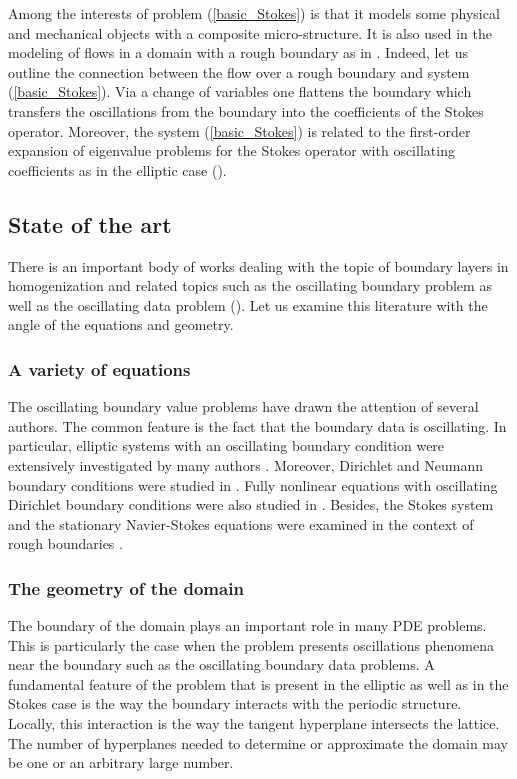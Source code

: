 \documentclass[11pt, reqno]{amsart}
\theoremstyle{definition}
\theoremstyle{remark}
\numberwithin{equation}{section}
\begin{document}
	Among the interests of problem (\ref{basic_Stokes}) is that it models  some physical and mechanical objects with a composite micro-structure. It is also used in the  modeling of flows in a domain with a rough boundary as in \cite{Slip_cond, KLS}. Indeed, let us outline the connection between the flow over a rough boundary and system (\ref{basic_Stokes}). Via a change of variables one flattens the boundary which transfers the oscillations from the boundary into the coefficients of the Stokes operator. Moreover, the system (\ref{basic_Stokes}) is related to the first-order expansion of eigenvalue problems for the Stokes operator with oscillating coefficients as in the elliptic case (\cite{Vogelius,Prange_eigen,hom_eigen}).
	



	\subsection{State of the art}
	There is an important body of works dealing with the topic of boundary layers in homogenization and related topics such as the oscillating boundary problem as well as the oscillating data problem (\cite{ aleyksan,AA,fully_nonlin,homogen_bl,Slip_cond,Prange,num_bound,regul_hmgnized_data,hom_finite_dom}). Let us examine this literature with the angle of the equations and geometry.	\subsubsection{A variety of equations}	The  oscillating boundary value problems have drawn the attention of several authors. The common feature is the fact that the boundary data is oscillating. In particular, elliptic systems with an oscillating boundary condition  were extensively investigated by many authors \cite{aleyksan,AA,Feldman,homogen_bl,homogen_polygon,KLS,Prange,num_bound,
	hom_finite_dom}. Moreover, Dirichlet \cite{aleyksan,AKMP} and  Neumann boundary conditions were studied in \cite{regul_hmgnized_data}. Fully nonlinear equations with oscillating Dirichlet boundary conditions were also studied in \cite{Feldman,fully_nonlin}. Besides, the Stokes system  and the stationary Navier-Stokes equations were examined in the context of rough  boundaries \cite{Slip_cond,HigPrZhuge}.
	\subsubsection{The geometry of the domain}	
	The boundary of the domain plays an important role in many PDE problems. This is particularly the case when the problem presents oscillations phenomena  near the boundary such as the oscillating boundary data problems.
	A fundamental feature of the problem that is present in the elliptic as well as in the Stokes case is the way the boundary interacts with the periodic structure. Locally, this interaction is the way the tangent hyperplane intersects the lattice. The number of hyperplanes needed to determine or approximate the domain may be one or an arbitrary large number.
	
\end{document}
